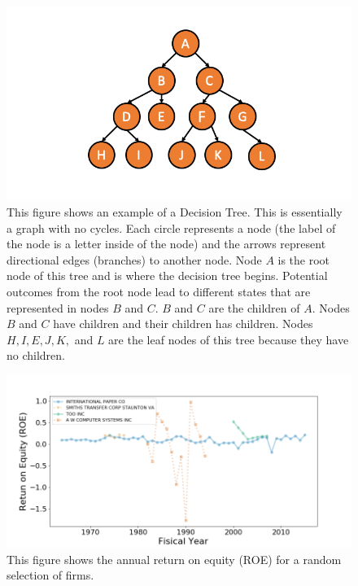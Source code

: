 \begin{figure}[!htb]
    \centering
      \includegraphics[width=\textwidth]{figures/ppt/DecisionTree.png}

    \caption{
	This figure shows an example of a Decision Tree. This is essentially a graph with no cycles.  Each circle represents a node (the label of the node is a letter inside of the node) and the arrows represent directional edges (branches) to another node. Node \(A\) is the root node of this tree and is where the decision tree begins. Potential outcomes from the root node lead to different states that are represented in nodes \(B\) and \(C\). \(B\) and \(C\) are the children of \(A\).  Nodes \(B\) and \(C\) have children and their children has children. Nodes \(H, I, E, J, K,\) and \(L\) are the leaf nodes of this tree because they have no children.
     }
      \label{fig:DecisionTree}
  \end{figure}

\begin{figure}
    \centering
    \includegraphics[width=\textwidth,height=0.87\textheight,keepaspectratio]{figures/ABIS/ABIS-DATA.png}
   \caption{This figure shows the annual return on equity (ROE) for a random selection of firms.}
      \label{fig:ABIS-DATA}
\end{figure}


